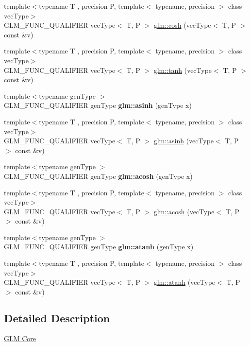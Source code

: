 \begin{DoxyCompactItemize}
\item 
{\footnotesize template$<$typename T , precision P, template$<$ typename, precision $>$ class vec\+Type$>$ }\\G\+L\+M\+\_\+\+F\+U\+N\+C\+\_\+\+Q\+U\+A\+L\+I\+F\+I\+ER vec\+Type$<$ T, P $>$ \hyperlink{group__core__func__trigonometric_ga660582a4e5e843b6c1cd535777e8c295}{glm\+::cosh} (vec\+Type$<$ T, P $>$ const \&v)
\item 
{\footnotesize template$<$typename T , precision P, template$<$ typename, precision $>$ class vec\+Type$>$ }\\G\+L\+M\+\_\+\+F\+U\+N\+C\+\_\+\+Q\+U\+A\+L\+I\+F\+I\+ER vec\+Type$<$ T, P $>$ \hyperlink{group__core__func__trigonometric_ga234e904a0075f88654a594b5f837711f}{glm\+::tanh} (vec\+Type$<$ T, P $>$ const \&v)
\item 
\mbox{\label{func__trigonometric_8inl_a95c8fa9b13f28e9bb3e232c67ad7e419}} 
{\footnotesize template$<$typename gen\+Type $>$ }\\G\+L\+M\+\_\+\+F\+U\+N\+C\+\_\+\+Q\+U\+A\+L\+I\+F\+I\+ER gen\+Type {\bfseries glm\+::asinh} (gen\+Type x)
\item 
{\footnotesize template$<$typename T , precision P, template$<$ typename, precision $>$ class vec\+Type$>$ }\\G\+L\+M\+\_\+\+F\+U\+N\+C\+\_\+\+Q\+U\+A\+L\+I\+F\+I\+ER vec\+Type$<$ T, P $>$ \hyperlink{group__core__func__trigonometric_ga72bf44c1984e1afb63acf821ba33cac7}{glm\+::asinh} (vec\+Type$<$ T, P $>$ const \&v)
\item 
\mbox{\label{func__trigonometric_8inl_a68b59a562e15154aa2ef3bfb8f2348dc}} 
{\footnotesize template$<$typename gen\+Type $>$ }\\G\+L\+M\+\_\+\+F\+U\+N\+C\+\_\+\+Q\+U\+A\+L\+I\+F\+I\+ER gen\+Type {\bfseries glm\+::acosh} (gen\+Type x)
\item 
{\footnotesize template$<$typename T , precision P, template$<$ typename, precision $>$ class vec\+Type$>$ }\\G\+L\+M\+\_\+\+F\+U\+N\+C\+\_\+\+Q\+U\+A\+L\+I\+F\+I\+ER vec\+Type$<$ T, P $>$ \hyperlink{group__core__func__trigonometric_ga3f368ad3e1883b60748ca2634d816104}{glm\+::acosh} (vec\+Type$<$ T, P $>$ const \&v)
\item 
\mbox{\label{func__trigonometric_8inl_a97f30482bc92e985c2da212b97d40f10}} 
{\footnotesize template$<$typename gen\+Type $>$ }\\G\+L\+M\+\_\+\+F\+U\+N\+C\+\_\+\+Q\+U\+A\+L\+I\+F\+I\+ER gen\+Type {\bfseries glm\+::atanh} (gen\+Type x)
\item 
{\footnotesize template$<$typename T , precision P, template$<$ typename, precision $>$ class vec\+Type$>$ }\\G\+L\+M\+\_\+\+F\+U\+N\+C\+\_\+\+Q\+U\+A\+L\+I\+F\+I\+ER vec\+Type$<$ T, P $>$ \hyperlink{group__core__func__trigonometric_gaffa8decdd8620759f4e6fe4834768b87}{glm\+::atanh} (vec\+Type$<$ T, P $>$ const \&v)
\end{DoxyCompactItemize}


\subsection{Detailed Description}
\hyperlink{group__core}{G\+LM Core} 